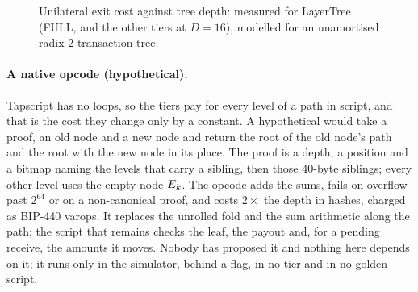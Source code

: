 \iffullversion
\begin{figure}[tbp]
\centering
{}
\caption{Unilateral exit cost against tree depth: measured for LayerTree (FULL, and the other tiers at $D=16$), modelled for an unamortised radix-2 transaction tree.}
\label{fig:plot}
\end{figure}
\fi

\iffullversion
\paragraph{A native opcode (hypothetical).} Tapscript has no loops, so
the tiers pay for every level of a path in script, and that is the cost
they change only by a constant. A hypothetical  would
take a proof, an old node and a new node and return the root of the old
node's path and the root with the new node in its place. The proof is a
depth, a position and a bitmap naming the levels that carry a sibling,
then those 40-byte siblings; every other level uses the empty node
$E_k$. The opcode adds the sums, fails on overflow past $2^{64}$ or on
a non-canonical proof, and costs $2\times$ the depth in hashes, charged as
BIP-440 varops. It replaces the unrolled fold and the sum arithmetic along the path; the script that remains checks the leaf, the payout and, for a pending receive, the amounts it moves. Nobody has proposed it and nothing here depends on
it; it runs only in the simulator, behind a flag, in no tier and in no golden script.

